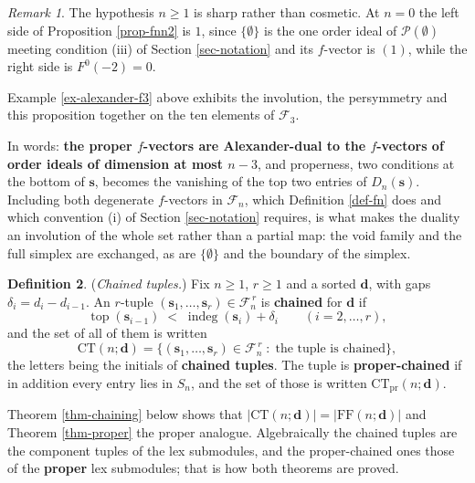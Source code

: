 \documentclass[11pt, a4paper, abstract=yes]{scrartcl}
\theoremstyle{definition}
\newtheorem{definition}{Definition}
\theoremstyle{remark}
\newtheorem{remark}[definition]{Remark}
\theoremstyle{plain}
\newcommand{\vek}[1]{\boldsymbol{#1}}
\newcommand{\indeg}{\operatorname{indeg}}
\newcommand{\tp}{\operatorname{top}}
\begin{document}
\begin{remark}
The hypothesis \(n\ge1\) is sharp rather than cosmetic. At \(n=0\) the left side of
Proposition \ref{prop-fnn2} is \(1\), since \(\lbrace\emptyset\rbrace\) is the one order ideal of
\(\mathcal P(\emptyset)\) meeting condition (iii) of Section \ref{sec-notation} and its \(f\)-vector is
\((1)\), while the right side is \(F^0(-2)=0\).
\label{rem-fnn2-sharp}
\end{remark}

Example \ref{ex-alexander-f3} above exhibits the involution, the persymmetry and this proposition
together on the ten elements of \(\mathcal F_3\).

In words: \textbf{the proper \(f\)-vectors are Alexander-dual to the \(f\)-vectors of order ideals of
dimension at most \(n-3\)}, and properness, two conditions at the bottom of \(\vek s\), becomes
the vanishing of the top two entries of \(D_n(\vek s)\). Including both degenerate \(f\)-vectors in
\(\mathcal F_n\), which Definition \ref{def-fn} does and which convention (i) of Section
\ref{sec-notation} requires, is what makes the duality an involution of the whole set rather than a
partial map: the void family and the full simplex are exchanged, as are \(\lbrace\emptyset\rbrace\)
and the boundary of the simplex.

\begin{definition}
(\emph{Chained tuples.}) Fix \(n\ge1\), \(r\ge1\) and a sorted \(\vek d\), with gaps
\(\delta_i=d_i-d_{i-1}\). An \(r\)-tuple \((\vek s_1,\dots,\vek s_r)\in\mathcal F_n^{\,r}\) is
\textbf{chained} for \(\vek d\) if
\begin{equation}\label{eq:chaining-condition}
  \tp(\vek s_{i-1})\;<\;\indeg(\vek s_i)+\delta_i \qquad (i=2,\dots,r) ,
\end{equation}
and the set of all of them is written
\begin{equation}\label{eq:chained-set}
  \mathrm{CT}(n;\vek d)=\bigl\lbrace(\vek s_1,\dots,\vek s_r)\in\mathcal F_n^{\,r}\;:\;
    \text{the tuple is chained}\bigr\rbrace ,
\end{equation}
the letters being the initials of \textbf{chained tuples}. The tuple is \textbf{proper-chained} if in addition
every entry lies in \(S_n\), and the set of those is written \(\mathrm{CT}_{\mathrm{pr}}(n;\vek d)\).

Theorem \ref{thm-chaining} below shows that \(\lvert\mathrm{CT}(n;\vek d)\rvert=\lvert\mathrm{FF}(n;\vek
d)\rvert\) and Theorem \ref{thm-proper} the proper analogue. Algebraically the chained tuples are the
component tuples of the lex submodules, and the proper-chained ones those of the \textbf{proper} lex
submodules; that is how both theorems are proved.
\label{def-chained}
\end{definition}
\end{document}
